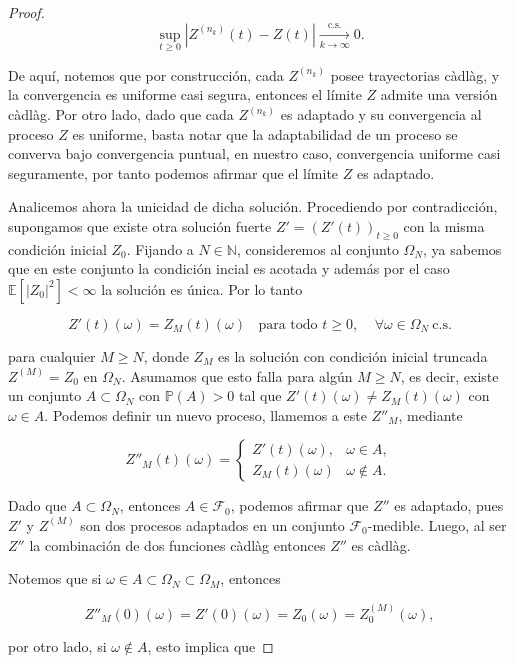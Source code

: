 \documentclass[
  spanish,
  us-letterpaper,
]{scrreprt}
\theoremstyle{plain}
\theoremstyle{plain}
\theoremstyle{definition}
\theoremstyle{plain}
\theoremstyle{remark}
\begin{document}
\begin{proof}
\[
    \sup\limits_{t\geq 0}|Z^{(n_k)}(t)-Z(t)| \xrightarrow[k \to \infty]{\text{c.s.}} 0.
\]

De aquí, notemos que por construcción, cada \(Z^{(n_k)}\) posee
trayectorias càdlàg, y la convergencia es uniforme casi segura, entonces
el límite \(Z\) admite una versión càdlàg. Por otro lado, dado que cada
\(Z^{(n_k)}\) es adaptado y su convergencia al proceso \(Z\) es
uniforme, basta notar que la adaptabilidad de un proceso se converva
bajo convergencia puntual, en nuestro caso, convergencia uniforme casi
seguramente, por tanto podemos afirmar que el límite \(Z\) es adaptado.

Analicemos ahora la unicidad de dicha solución. Procediendo por
contradicción, supongamos que existe otra solución fuerte
\(Z'=(Z'(t))_{t\geq 0}\) con la misma condición inicial \(Z_0\). Fijando
a \(N\in \mathbb{N}\), consideremos al conjunto \(\Omega_N\), ya sabemos
que en este conjunto la condición incial es acotada y además por el caso
\(\mathbb{E}[|Z_0|^2]<\infty\) la solución es única. Por lo tanto

\[
    Z'(t)(\omega) = Z_M(t)(\omega)\ \ \ \  \text{para todo }t\geq 0,\ \ \ \ \ \forall\omega\in \Omega_N\ \text{c.s.}
\]

para cualquier \(M\geq N\), donde \(Z_M\) es la solución con condición
inicial truncada \(Z^{(M)}=Z_0\) en \(\Omega_N\). Asumamos que esto
falla para algún \(M\geq N\), es decir, existe un conjunto
\(A\subset \Omega_N\) con \(\mathbb{P}(A)>0\) tal que
\(Z'(t)(\omega)\neq Z_M(t)(\omega)\) con \(\omega\in A.\) Podemos
definir un nuevo proceso, llamemos a este \(Z''_M\), mediante

\[
Z''_M(t)(\omega) =
\begin{cases}
Z'(t)(\omega), & \omega\in A, \\
Z_M(t)(\omega) & \omega\notin A.
\end{cases}    
\]

Dado que \(A\subset \Omega_N\), entonces \(A\in \mathcal{F}_0\), podemos
afirmar que \(Z''\) es adaptado, pues \(Z'\) y \(Z^{(M)}\) son dos
procesos adaptados en un conjunto \(\mathcal{F}_0\)-medible. Luego, al
ser \(Z''\) la combinación de dos funciones càdlàg entonces \(Z''\) es
càdlàg.

Notemos que si \(\omega\in A\subset \Omega_N\subset \Omega_M\), entonces

\[
    Z''_M(0)(\omega)=Z'(0)(\omega)=Z_0(\omega)=Z_0^{(M)}(\omega),
\]

por otro lado, si \(\omega\notin A\), esto implica que


\end{proof}
\end{document}
